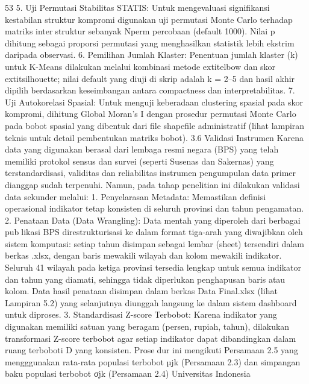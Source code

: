 53
5. Uji Permutasi Stabilitas STATIS: Untuk mengevaluasi signifikansi kestabilan
struktur kompromi digunakan uji permutasi Monte Carlo terhadap matriks interstruktur sebanyak Nperm percobaan (default 1000). Nilai p dihitung sebagai proporsi
permutasi yang menghasilkan statistik lebih ekstrim daripada observasi.
6. Pemilihan Jumlah Klaster: Penentuan jumlah klaster (k) untuk K-Means dilakukan
melalui kombinasi metode extitelbow dan skor extitsilhouette; nilai default yang
diuji di skrip adalah k = 2–5 dan hasil akhir dipilih berdasarkan keseimbangan
antara compactness dan interpretabilitas.
7. Uji Autokorelasi Spasial: Untuk menguji keberadaan clustering spasial pada skor
kompromi, dihitung Global Moran’s I dengan prosedur permutasi Monte Carlo pada
bobot spasial yang dibentuk dari file shapefile administratif (lihat lampiran teknis
untuk detail pembentukan matriks bobot).
3.6 Validasi Instrumen
Karena data yang digunakan berasal dari lembaga resmi negara (BPS) yang telah
memiliki protokol sensus dan survei (seperti Susenas dan Sakernas) yang terstandardisasi,
validitas dan reliabilitas instrumen pengumpulan data primer dianggap sudah terpenuhi.
Namun, pada tahap penelitian ini dilakukan validasi data sekunder melalui:
1. Penyelarasan Metadata: Memastikan definisi operasional indikator tetap konsisten
di seluruh provinsi dan tahun pengamatan.
2. Penataan Data (Data Wrangling): Data mentah yang diperoleh dari berbagai publikasi BPS direstrukturisasi ke dalam format tiga-arah yang diwajibkan oleh sistem
komputasi: setiap tahun disimpan sebagai lembar (sheet) tersendiri dalam berkas
.xlsx, dengan baris mewakili wilayah dan kolom mewakili indikator. Seluruh
41 wilayah pada ketiga provinsi tersedia lengkap untuk semua indikator dan tahun
yang diamati, sehingga tidak diperlukan penghapusan baris atau kolom. Data hasil
penataan disimpan dalam berkas Data Final.xlsx (lihat Lampiran 5.2) yang
selanjutnya diunggah langsung ke dalam sistem dashboard untuk diproses.
3. Standardisasi Z-score Terbobot: Karena indikator yang digunakan memiliki satuan
yang beragam (persen, rupiah, tahun), dilakukan transformasi Z-score terbobot agar
setiap indikator dapat dibandingkan dalam ruang terboboti D yang konsisten. Prosedur ini mengikuti Persamaan 2.5 yang mengggunakan rata-rata populasi terbobot
µjk (Persamaan 2.3) dan simpangan baku populasi terbobot σjk (Persamaan 2.4)
Universitas Indonesia

